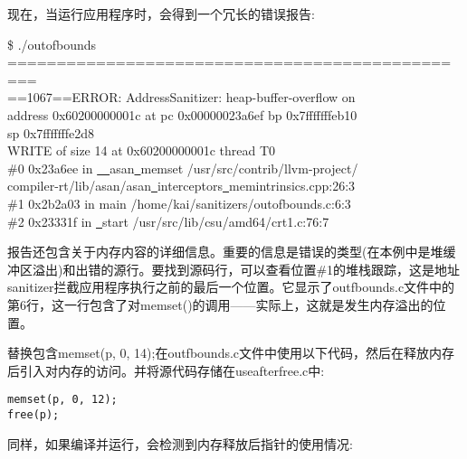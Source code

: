 现在，当运行应用程序时，会得到一个冗长的错误报告:\par

\begin{tcolorbox}[colback=white,colframe=black]
\$ ./outofbounds \\
============================================= \\
=== \\
==1067==ERROR: AddressSanitizer: heap-buffer-overflow on \\
address 0x60200000001c at pc 0x00000023a6ef bp 0x7fffffffeb10 \\
sp 0x7fffffffe2d8 \\
WRITE of size 14 at 0x60200000001c thread T0 \\
\hspace*{1cm}\#0 0x23a6ee in \underline{~~}asan\underline{~}memset /usr/src/contrib/llvm-project/ \\
compiler-rt/lib/asan/asan\underline{~}interceptors\underline{~}memintrinsics.cpp:26:3 \\
\hspace*{1cm}\#1 0x2b2a03 in main /home/kai/sanitizers/outofbounds.c:6:3 \\
\hspace*{1cm}\#2 0x23331f in \underline{~}start /usr/src/lib/csu/amd64/crt1.c:76:7
\end{tcolorbox}

报告还包含关于内存内容的详细信息。重要的信息是错误的类型(在本例中是堆缓冲区溢出)和出错的源行。要找到源码行，可以查看位置\#1的堆栈跟踪，这是地址sanitizer拦截应用程序执行之前的最后一个位置。它显示了outfbounds.c文件中的第6行，这一行包含了对memset()的调用——实际上，这就是发生内存溢出的位置。\par

替换包含memset(p, 0, 14);在outfbounds.c文件中使用以下代码，然后在释放内存后引入对内存的访问。并将源代码存储在useafterfree.c中:\par

\begin{lstlisting}[caption={}]
memset(p, 0, 12);
free(p);
\end{lstlisting}

同样，如果编译并运行，会检测到内存释放后指针的使用情况:\par

